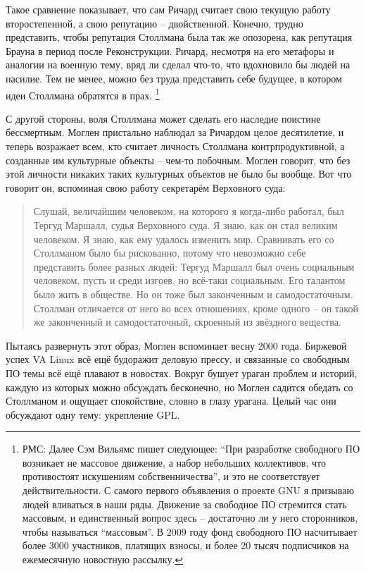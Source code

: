 Такое сравнение показывает, что сам Ричард считает свою текущую работу второстепенной, а свою репутацию -- двойственной. Конечно, трудно представить, чтобы репутация Столлмана была так же опозорена, как репутация Брауна в период после Реконструкции. Ричард, несмотря на его метафоры и аналогии на военную тему, вряд ли сделал что-то, что вдохновило бы людей на насилие. Тем не менее, можно без труда представить себе будущее, в котором идеи Столлмана обратятся в прах. \footnote{РМС: Далее Сэм Вильямс пишет следующее: \enquote{При разработке свободного ПО возникает не массовое движение, а набор небольших коллективов, что противостоят искушениям собственничества}, и это не соответствует действительности. С самого первого объявления о проекте GNU я призываю людей вливаться в наши ряды. Движение за свободное ПО стремится стать массовым, и единственный вопрос здесь -- достаточно ли у него сторонников, чтобы называться \enquote{массовым}. В 2009 году фонд свободного ПО насчитывает более 3000 участников, платящих взносы, и более 20 тысяч подписчиков на ежемесячную новостную рассылку.}

С другой стороны, воля Столлмана может сделать его наследие поистине бессмертным. Моглен пристально наблюдал за Ричардом целое десятилетие, и теперь возражает всем, кто считает личность Столлмана контрпродуктивной, а созданные им культурные объекты -- чем-то побочным. Моглен говорит, что без этой личности никаких таких культурных объектов не было бы вообще. Вот что говорит он, вспоминая свою работу секретарём Верховного суда:

\begin{quote}
Слушай, величайшим человеком, на которого я когда-либо работал, был Тергуд Маршалл, судья Верховного суда. Я знаю, как он стал великим человеком. Я знаю, как ему удалось изменить мир. Сравнивать его со Столлманом было бы рискованно, потому что невозможно себе представить более разных людей: Тергуд Маршалл был очень социальным человеком, пусть и среди изгоев, но всё-таки социальным. Его талантом было жить в обществе. Но он тоже был законченным и самодостаточным. Столлман отличается от него во всех отношениях, кроме одного -- он такой же законченный и самодостаточный, скроенный из звёздного вещества.
\end{quote}

Пытаясь развернуть этот образ, Моглен вспоминает весну 2000 года. Биржевой успех VA Linux всё ещё будоражит деловую прессу, и связанные со свободным ПО темы всё ещё плавают в новостях. Вокруг бушует ураган проблем и историй, каждую из которых можно обсуждать бесконечно, но Моглен садится обедать со Столлманом и ощущает спокойствие, словно в глазу урагана. Целый час они обсуждают одну тему: укрепление GPL.

